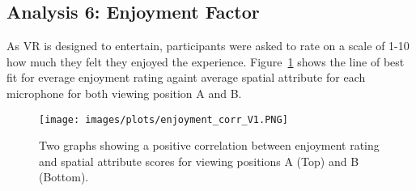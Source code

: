















\subsection{Analysis 6: Enjoyment Factor}

	As VR is designed to entertain, participants were asked to rate on a scale of 1-10 how much they felt they enjoyed the experience. Figure~\ref{image:enjoyment} shows the line of best fit for everage enjoyment rating againt average spatial attribute for each microphone for both viewing position A and B.
	

	\begin{figure}
		\texttt{[image: images/plots/enjoyment\_corr\_V1.PNG]}
		\caption{Two graphs showing a positive correlation between enjoyment rating and spatial attribute scores for viewing positions A (Top) and B (Bottom).}
		\label{image:enjoyment} 
	\end{figure}		
